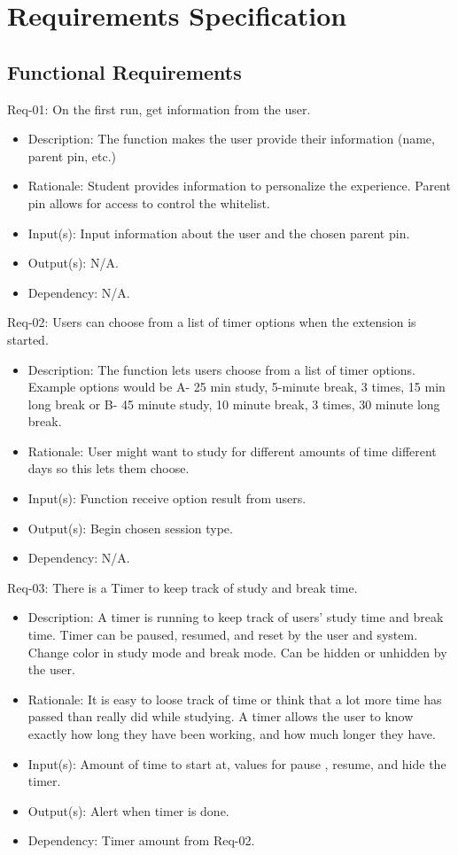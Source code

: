 \documentclass[12pt]{article}
\begin{document}
\section{Requirements Specification}
\subsection{Functional Requirements}
Req-01: On the first run, get information from the user.
\begin{itemize}
    \item Description: The function makes the user provide their information (name, parent pin, etc.) 
    \item Rationale: Student provides information to personalize the experience. Parent pin allows for access to control the whitelist.  
    \item Input(s): Input information about the user and the chosen parent pin. 
    \item Output(s): N/A. 
    \item Dependency: N/A. 
\end{itemize}
Req-02: Users can choose from a list of timer options when the extension is started. 
\begin{itemize}
    \item Description: The function lets users choose from a list of timer options. Example options would be A- 25 min study, 5-minute break, 3 times, 15 min long break or B- 45 minute study, 10 minute break, 3 times, 30 minute long break. 
    \item Rationale: User might want to study for different amounts of time different days so this lets them choose. 
    \item Input(s): Function receive option result from users. 
    \item Output(s): Begin chosen session type.
    \item Dependency: N/A.
\end{itemize}
Req-03:  There is a Timer to keep track of study and break time. 
\begin{itemize}
    \item Description: A timer is running to keep track of users’ study time and break time. Timer can be paused, resumed, and reset by the user and system. Change color in study mode and break mode. Can be hidden or unhidden by the user.
    \item Rationale: It is easy to loose track of time or think that a lot more time has passed than really did while studying. A timer allows the user to know exactly how long they have been working, and how much longer they have. 
    \item Input(s): Amount of time to start at, values for pause , resume, and hide the timer.
    \item Output(s): Alert when timer is done.
    \item Dependency: Timer amount from Req-02.
\end{itemize}
\end{document}
